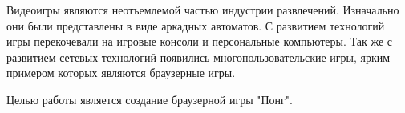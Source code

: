 \Introduction

Видеоигры являются неотъемлемой частью индустрии развлечений. Изначально они были представлены в виде аркадных автоматов. С развитием технологий игры перекочевали на игровые консоли и персональные компьютеры. Так же с развитием сетевых технологий появились многопользовательские игры, ярким примером которых являются браузерные игры. 

Целью работы является создание браузерной игры "Понг".